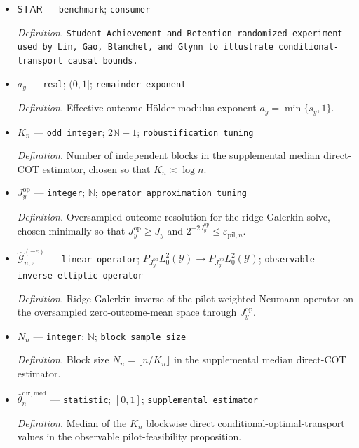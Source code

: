 \documentclass{article}
\begin{document}
\begin{itemize}
  \par\smallskip\noindent\emph{Definition.} \texttt{Uniform constant multiplying the corrected pilot-\allowbreak{}remainder envelope in the prospective calibration handle.}
  \item \(\mathsf{STAR}\) --- \texttt{benchmark}; \texttt{consumer}
  \par\smallskip\noindent\emph{Definition.} \texttt{Student Achievement and Retention randomized experiment used by Lin,\allowbreak{} Gao,\allowbreak{} Blanchet,\allowbreak{} and Glynn to illustrate conditional-\allowbreak{}transport causal bounds.}
  \item \(a_y\) --- \texttt{real}; \((0,1]\); \texttt{remainder exponent}
  \par\smallskip\noindent\emph{Definition.} Effective outcome H\"older modulus exponent \(a_y=\min\{s_y,1\}\).
  \item \(K_n\) --- \texttt{odd integer}; \(2\mathbb N+1\); \texttt{robustification tuning}
  \par\smallskip\noindent\emph{Definition.} Number of independent blocks in the supplemental median direct-COT estimator, chosen so that \(K_n\asymp\log n\).
  \item \(J_y^{\mathrm{op}}\) --- \texttt{integer}; \(\mathbb N\); \texttt{operator approximation tuning}
  \par\smallskip\noindent\emph{Definition.} Oversampled outcome resolution for the ridge Galerkin solve, chosen minimally so that \(J_y^{\mathrm{op}}\ge J_y\) and \(2^{-2J_y^{\mathrm{op}}}\le\varepsilon_{\mathrm{pil},n}\).
  \item \(\widehat{\mathcal G}_{n,z}^{(-e)}\) --- \texttt{linear operator}; \(P_{J_y^{\mathrm{op}}}L_0^2(\mathcal Y)\to P_{J_y^{\mathrm{op}}}L_0^2(\mathcal Y)\); \texttt{observable inverse-\allowbreak{}elliptic operator}
  \par\smallskip\noindent\emph{Definition.} Ridge Galerkin inverse of the pilot weighted Neumann operator on the oversampled zero-outcome-mean space through \(J_y^{\mathrm{op}}\).
  \item \(N_n\) --- \texttt{integer}; \(\mathbb N\); \texttt{block sample size}
  \par\smallskip\noindent\emph{Definition.} Block size \(N_n=\lfloor n/K_n\rfloor\) in the supplemental median direct-COT estimator.
  \item \(\widehat\theta_n^{\mathrm{dir,med}}\) --- \texttt{statistic}; \([0,1]\); \texttt{supplemental estimator}
  \par\smallskip\noindent\emph{Definition.} Median of the \(K_n\) blockwise direct conditional-optimal-transport values in the observable pilot-feasibility proposition.

\end{itemize}
\end{document}
